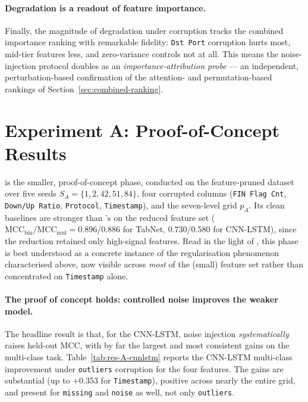 \documentclass[../main.tex]{subfiles}
\begin{document}
\paragraph{Degradation is a readout of feature importance.}
Finally, the magnitude of degradation under corruption tracks the combined importance ranking with remarkable fidelity: \texttt{Dst Port} corruption hurts most, mid-tier features less, and zero-variance controls not at all. This means the noise-injection protocol doubles as an \emph{importance-attribution probe} --- an independent, perturbation-based confirmation of the attention- and permutation-based rankings of Section~\ref{sec:combined-ranking}.

\newpage
\section{Experiment A: Proof-of-Concept Results}
\label{sec:res-A}

 is the smaller, proof-of-concept phase, conducted on the feature-pruned dataset over five seeds $S_A = \{1, 2, 42, 51, 84\}$, four corrupted columns (\texttt{FIN Flag Cnt}, \texttt{Down/Up Ratio}, \texttt{Protocol}, \texttt{Timestamp}), and the seven-level grid $p_A$. Its clean baselines are stronger than 's on the reduced feature set ($\mathrm{MCC}_{\text{bin}}/\mathrm{MCC}_{\text{mul}} = 0.896/0.886$ for TabNet, $0.730/0.580$ for CNN-LSTM), since the reduction retained only high-signal features. Read in the light of , this phase is best understood as a concrete instance of the regularisation phenomenon characterised above, now visible across \emph{most} of the (small) feature set rather than concentrated on \texttt{Timestamp} alone.

\paragraph{The proof of concept holds: controlled noise improves the weaker model.}
The headline result is that, for the CNN-LSTM, noise injection \emph{systematically} raises held-out MCC, with by far the largest and most consistent gains on the multi-class task. Table~\ref{tab:res-A-cnnlstm} reports the CNN-LSTM multi-class improvement under \texttt{outliers} corruption for the four features. The gains are substantial (up to $+0.353$ for \texttt{Timestamp}), positive across nearly the entire grid, and present for \texttt{missing} and \texttt{noise} as well, not only \texttt{outliers}.
\end{document}
